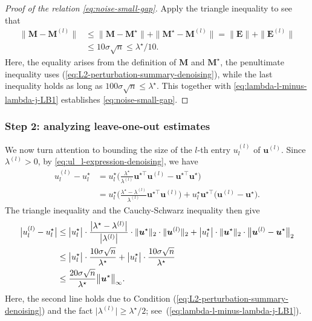 \medskip
\begin{proof}[Proof of the relation \eqref{eq:noise-small-gap}] Apply the triangle inequality to see that
\begin{align*}
\|\bm{M}-\bm{M}^{(l)}\|&\leq\|\bm{M}-\bm{M}^{\star}\|+\|\bm{M}^{\star}-\bm{M}^{(l)}\|=\|\bm{E}\|+\|\bm{E}^{(l)}\| \\
&\leq10\sigma\sqrt{n}\leq\lambda^{\star}/10.
\end{align*}
%
Here, the equality arises from the definition of $\bm{M}$ and $\bm{M}^{\star}$,
the penultimate inequality uses (\ref{eq:L2-perturbation-summary-denoising}), while the last inequality holds as long
as $100\sigma\sqrt{n}\leq\lambda^{\star}$. This together with \eqref{eq:lambda-l-minus-lambda-j-LB1} establishes \eqref{eq:noise-small-gap}.
%
\end{proof}


\subsubsection{Step 2: analyzing leave-one-out estimates}

We now turn attention to bounding the size of the $l$-th entry $u_l^{(l)}$ of $\bm{u}^{(l)}$. Since $\lambda^{(l)}> 0$, by \eqref{eq:ul_l-expression-denoising}, we have 
%
\begin{align*}
u_{l}^{(l)}-u_{l}^{\star} & %
=u_{l}^{\star}\Big(\frac{\lambda^{\star}}{\lambda^{(l)}}\bm{u}^{\star\top}\bm{u}^{(l)}-\bm{u}^{\star\top}\bm{u}^{\star}\Big)\\
 & =u_{l}^{\star}\Big(\frac{\lambda^{\star}-\lambda^{(l)}}{\lambda^{(l)}}\bm{u}^{\star\top}\bm{u}^{(l)}\Big)+u_{l}^{\star}\bm{u}^{\star\top}\big(\bm{u}^{(l)}-\bm{u}^{\star}\big).
\end{align*}
%
The triangle inequality and the Cauchy-Schwarz inequality then give
%
\begin{align}
\big|u_{l}^{(l)}-u_{l}^{\star}\big|
& \leq\big|u_{l}^{\star}\big|\cdot\frac{\big|\lambda^{\star}-\lambda^{(l)}\big|}{\big|\lambda^{(l)}\big|} \cdot \|\bm{u}^{\star}\|_{2} \cdot \|\bm{u}^{(l)}\|_{2}
	+ \big|u_{l}^{\star}\big|\cdot\|\bm{u}^{\star}\|_{2} \cdot \big\|\bm{u}^{(l)}-\bm{u}^{\star}\big\|_{2} \notag\\
 & \leq\big|u_{l}^{\star}\big|\cdot\frac{10\sigma\sqrt{n}}{\lambda^{\star}}+\big|u_{l}^{\star}\big|\cdot\frac{10\sigma\sqrt{n}}{\lambda^{\star}} \notag\\
 & \leq  \frac{20\sigma\sqrt{n}}{\lambda^{\star}} \big\|\bm{u}^{\star}\big\|_{\infty}.
	\label{eq:ul-ulstar-bound-denoising-rank1}
\end{align}
%
Here, the second line holds due to Condition (\ref{eq:L2-perturbation-summary-denoising}) and the fact $\big|\lambda^{(l)}\big|\geq\lambda^{\star}/2$; see~(\ref{eq:lambda-l-minus-lambda-j-LB1}).



